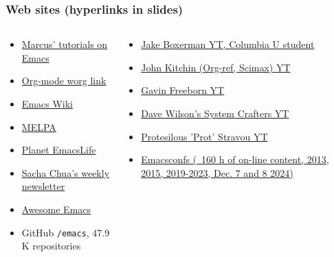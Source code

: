\documentclass[aspectratio=169]{beamer}
\begin{document}
\begin{frame} 
\frametitle{Web sites (hyperlinks in slides)}
\begin{columns}
\begin{column}{0.48\textwidth}
    \begin{itemize}[font=$\bullet$\scshape\bfseries]
       \item \href{https://github.com/birkenkrahe/org/blob/master/emacs/tutorial.org}{Marcus' tutorials on Emacs}
       \item \href{https://orgmode.org/worg/}{Org-mode worg link}
       \item \href{https://www.emacswiki.org}{Emacs Wiki}
       \item \href{https://melpa.org/#/}{MELPA}
       \item \href{https://planet.emacslife.com/}{Planet EmacsLife }
       \item \href{https://sachachua.com/blog/2024/11/2024-11-18-emacs-news/}{Sacha Chua's weekly newsletter}
       \item \href{https://github.com/emacs-tw/awesome-emacs}{Awesome Emacs}
        \item GitHub \verb|/emacs|, 47.9 K repositories
    \end{itemize}
\end{column}
\begin{column}{0.48\textwidth}
    \begin{itemize}[font=$\bullet$\scshape\bfseries]
     \item \href{https://www.youtube.com/@JakeBox0}{Jake Boxerman YT, Columbia U student}
     \item \href{https://www.youtube.com/@JohnKitchin}{John Kitchin (Org-ref, Scimax) YT }
     \item \href{https://www.youtube.com/@GavinFreeborn}{Gavin Freeborn YT}
     \item \href{https://www.youtube.com/@SystemCrafters}{Dave Wilson's System Crafters YT}
     \item \href{https://www.youtube.com/@protesilaos}{Protesilous 'Prot' Stravou YT}
     \item \href{https://emacsconf.org/}{Emacsconfs (~160 h of on-line content, 2013, 2015, 2019-2023, Dec. 7 and 8 2024)}
    \end{itemize}
\end{column}
\end{columns}
\end{frame}
\end{document}
